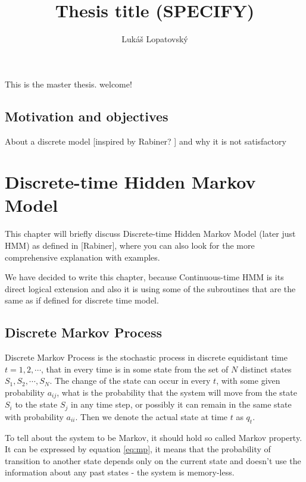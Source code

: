 \documentclass[thesis=M,english]{FITthesis}[2012/10/20]
\title{Thesis title (SPECIFY)}
\author{Luk{\' a}{\v s} Lopatovsk{\' y}} %
\begin{document}


\begin{introduction}
	This is the master thesis. welcome!
	\section{Motivation and objectives}
	About a discrete model [inspired by Rabiner? ] and why it is not satisfactory  %
\end{introduction}


\chapter{Discrete-time Hidden Markov Model}
This chapter will briefly discuss Discrete-time Hidden Markov Model (later just HMM) as defined in [Rabiner], where you can also look for the more comprehensive explanation with examples.

We have decided to write this chapter, because Continuous-time HMM is its direct logical extension and also it is using some of the subroutines that are the same as if defined for discrete time model.

\section{Discrete Markov Process}
    
Discrete Markov Process is the stochastic process in discrete equidistant time $t= 1,2,\cdots$, that in every time is in some state from the set of $N$ distinct states $S_1,S_2, \cdots, S_N $. The change of the state can occur in every $t$, with some given probability $a_{ij}$, what is the probability that the system will move from the state $S_i$ to the state $S_j$ in any time step, or possibly it can remain in the same state with probability $a_{ii}$. Then we denote the actual state at time $t$ as $q_t$.

To tell about the system to be Markov, it should hold so called Markov property. It can be expressed by equation \eqref{eq:mp}, it means that the probability of transition to another state depends only on the current state and doesn't use the information about any past states - the system is memory-less.
\end{document}
